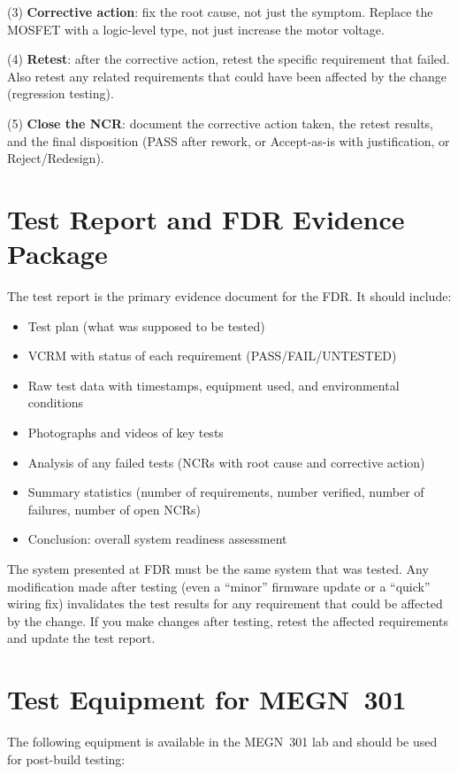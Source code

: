 (3) \textbf{Corrective action}: fix the root cause, not just the symptom. Replace the MOSFET with a logic-level type, not just increase the motor voltage.

(4) \textbf{Retest}: after the corrective action, retest the specific requirement that failed. Also retest any related requirements that could have been affected by the change (regression testing).

(5) \textbf{Close the NCR}: document the corrective action taken, the retest results, and the final disposition (PASS after rework, or Accept-as-is with justification, or Reject/Redesign).

\section{Test Report and FDR Evidence Package}
The test report is the primary evidence document for the FDR. It should include:

\begin{itemize}[nosep,leftmargin=1.5em]
\item Test plan (what was supposed to be tested)
\item VCRM with status of each requirement (PASS/FAIL/UNTESTED)
\item Raw test data with timestamps, equipment used, and environmental conditions
\item Photographs and videos of key tests
\item Analysis of any failed tests (NCRs with root cause and corrective action)
\item Summary statistics (number of requirements, number verified, number of failures, number of open NCRs)
\item Conclusion: overall system readiness assessment
\end{itemize}

\begin{warningbox}
The system presented at FDR must be the same system that was tested. Any modification made after testing (even a ``minor'' firmware update or a ``quick'' wiring fix) invalidates the test results for any requirement that could be affected by the change. If you make changes after testing, retest the affected requirements and update the test report.
\end{warningbox}

\section{Test Equipment for MEGN~301}
The following equipment is available in the MEGN~301 lab and should be used for post-build testing:

